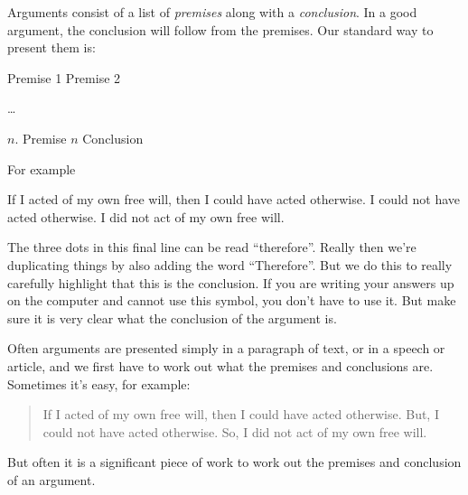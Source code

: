 Arguments consist of a list of \emph{premises} along with a \emph{conclusion}. In a good argument, the conclusion will follow from the premises.
Our standard way to present them is:
\begin{earg}
\prem Premise 1
\prem Premise 2
\item[] \dots
\item[$n$.] Premise $n$
\conc Conclusion
\end{earg}
For	example
	\begin{earg}
	\prem If I acted of my own free will, then I could have acted otherwise.
	\prem I could not have acted otherwise.
	\conc I did not act of my own free will.
	\end{earg}

The three dots in this final line can be read ``therefore''. Really then we're duplicating things by also adding the word ``Therefore''. But we do this to really carefully highlight that this is the conclusion. If you are writing your answers up on the computer and cannot use this symbol, you don't have to use it. But make sure it is very clear what the conclusion of the argument is. 


Often arguments are presented simply in a paragraph of text, or in a speech or article, and we first have to work out what the premises and conclusions are.
Sometimes it's easy, for example:
\begin{quote}
	If I acted of my own free will, then I could have acted otherwise.
	But, I could not have acted otherwise.
	So, I did not act of my own free will.
\end{quote}
But often it is a significant piece of work to work out the premises and conclusion of an argument.





